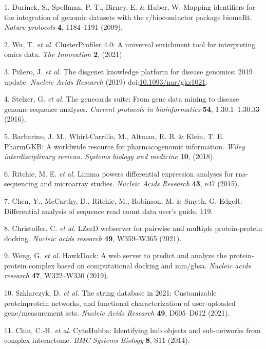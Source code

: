 \documentclass[
]{article}
\newenvironment{cslreferences}%
  {}%
  {\par}
\begin{document}
\hypertarget{refs}{}
\begin{cslreferences}
\leavevmode\hypertarget{ref-MappingIdentifDurinc2009}{}%
1. Durinck, S., Spellman, P. T., Birney, E. \& Huber, W. Mapping identifiers for the integration of genomic datasets with the r/bioconductor package biomaRt. \emph{Nature protocols} \textbf{4}, 1184--1191 (2009).

\leavevmode\hypertarget{ref-ClusterprofilerWuTi2021}{}%
2. Wu, T. \emph{et al.} ClusterProfiler 4.0: A universal enrichment tool for interpreting omics data. \emph{The Innovation} \textbf{2}, (2021).

\leavevmode\hypertarget{ref-TheDisgenetKnPinero2019}{}%
3. Piñero, J. \emph{et al.} The disgenet knowledge platform for disease genomics: 2019 update. \emph{Nucleic Acids Research} (2019) doi:\href{https://doi.org/10.1093/nar/gkz1021}{10.1093/nar/gkz1021}.

\leavevmode\hypertarget{ref-TheGenecardsSStelze2016}{}%
4. Stelzer, G. \emph{et al.} The genecards suite: From gene data mining to disease genome sequence analyses. \emph{Current protocols in bioinformatics} \textbf{54}, 1.30.1--1.30.33 (2016).

\leavevmode\hypertarget{ref-PharmgkbAWorBarbar2018}{}%
5. Barbarino, J. M., Whirl-Carrillo, M., Altman, R. B. \& Klein, T. E. PharmGKB: A worldwide resource for pharmacogenomic information. \emph{Wiley interdisciplinary reviews. Systems biology and medicine} \textbf{10}, (2018).

\leavevmode\hypertarget{ref-LimmaPowersDiRitchi2015}{}%
6. Ritchie, M. E. \emph{et al.} Limma powers differential expression analyses for rna-sequencing and microarray studies. \emph{Nucleic Acids Research} \textbf{43}, e47 (2015).

\leavevmode\hypertarget{ref-EdgerDifferenChen}{}%
7. Chen, Y., McCarthy, D., Ritchie, M., Robinson, M. \& Smyth, G. EdgeR: Differential analysis of sequence read count data user's guide. 119.

\leavevmode\hypertarget{ref-LzerdWebserverChrist2021}{}%
8. Christoffer, C. \emph{et al.} LZerD webserver for pairwise and multiple protein-protein docking. \emph{Nucleic acids research} \textbf{49}, W359--W365 (2021).

\leavevmode\hypertarget{ref-HawkdockAWebWeng2019}{}%
9. Weng, G. \emph{et al.} HawkDock: A web server to predict and analyze the protein-protein complex based on computational docking and mm/gbsa. \emph{Nucleic acids research} \textbf{47}, W322--W330 (2019).

\leavevmode\hypertarget{ref-TheStringDataSzklar2021}{}%
10. Szklarczyk, D. \emph{et al.} The string database in 2021: Customizable proteinprotein networks, and functional characterization of user-uploaded gene/measurement sets. \emph{Nucleic Acids Research} \textbf{49}, D605--D612 (2021).

\leavevmode\hypertarget{ref-CytohubbaIdenChin2014}{}%
11. Chin, C.-H. \emph{et al.} CytoHubba: Identifying hub objects and sub-networks from complex interactome. \emph{BMC Systems Biology} \textbf{8}, S11 (2014).
\end{cslreferences}
\end{document}
